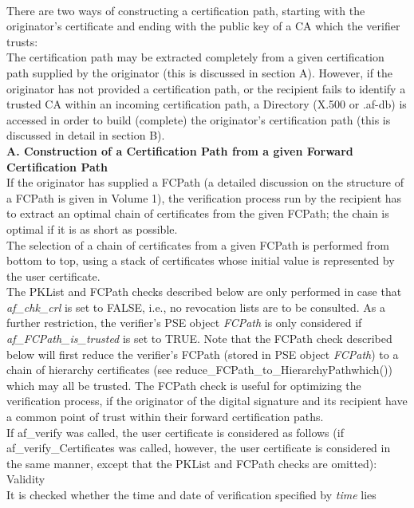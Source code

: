 \\ [1em]
There are two ways of constructing a certification path, starting with the 
originator's certificate and ending with the public key of a CA which the 
verifier trusts: \\
The certification path may be extracted completely from a given certification 
path supplied by the originator (this is discussed in section A). 
However, if the originator has not provided a certification path, or the recipient 
fails to identify a trusted CA within an incoming 
certification path, a Directory (X.500 or .af-db) is accessed in order to build 
(complete) the originator's certification path (this is discussed in detail 
in section B).
\\ [1em]

{\bf A. Construction of a Certification Path from a given Forward Certification Path}
\\ [1em]
If the originator has supplied a FCPath (a detailed discussion on the structure 
of a FCPath is given in Volume 1), the verification
process run by the recipient has to extract an optimal chain of certificates 
from the given FCPath; the chain is optimal if it is as short as possible.
\\ [1em]
The selection of a chain of certificates from a given FCPath is performed
from bottom to top, using a stack of certificates whose initial value
is represented by the user certificate.
\\ [1em]
The PKList and FCPath checks described below are only performed in case that {\em af\_chk\_crl}
is set to FALSE, i.e., no revocation lists are to be consulted. As a further restriction, 
the verifier's PSE object {\em FCPath} is only
considered if {\em af\_FCPath\_is\_trusted} is set to TRUE. Note that the
FCPath check described below will first reduce the verifier's FCPath (stored in PSE object
{\em FCPath}) to a chain of hierarchy certificates (see reduce\_FCPath\_to\_HierarchyPathwhich()) 
which may all be trusted. The FCPath check is useful for optimizing the verification process,
if the originator of the digital signature and its recipient have a common point of trust
within their forward certification paths.
\\ [1em]
If af\_verify was called, the user certificate is considered as follows (if
af\_verify\_Certificates was called, however, the user certificate is considered in the
same manner, except that the PKList and FCPath checks are omitted):
\be
\m Validity \\
It is checked whether the time and date of verification specified by {\em time} lies 
